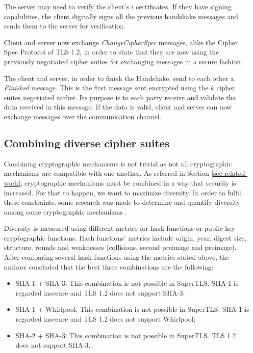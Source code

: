 \documentclass{sig-alternate-05-2015}
\begin{document}
The server may need to verify the client's $i$ certificates. If they have signing capabilities, the client digitally signs all the previous handshake messages and sends them to the server for verification.

Client and server now exchange \textit{ChangeCipherSpec} messages, alike the Cipher Spec Protocol of TLS 1.2, in order to state that they are now using the previously negotiated cipher suites for exchanging messages in a secure fashion.

The client and server, in order to finish the Handshake, send to each other a \textit{Finished} message. This is the first message sent encrypted using the $k$ cipher suites negotiated earlier. Its purpose is to each party receive and validate the data received in this message. If the data is valid, client and server can now exchange messages over the communication channel.

\subsection{Combining diverse cipher suites}

Combining cryptographic mechanisms is not trivial as not all cryptographic mechanisms are compatible with one another. As referred in Section \ref{sec-related-work}, cryptographic mechanisms must be combined in a way that security is increased. For that to happen, we want to maximize diversity.
In order to fulfil these constraints, some research was made to determine and quantify diversity among some cryptographic mechanisms \cite{CarvalhoThesis14}.

Diversity is measured using different metrics for hash functions or public-key cryptographic functions. Hash functions' metrics include origin, year, digest size, structure, rounds and weaknesses (collisions, second preimage and preimage).
After comparing several hash functions using the metrics stated above, the authors concluded that the best three combinations are the following:
\begin{itemize}
\item {SHA-1 + SHA-3: This combination is not possible in SuperTLS. SHA-1 is regarded insecure and TLS 1.2 does not support SHA-3;}
\item {SHA-1 + Whirlpool: This combination is not possible in SuperTLS. SHA-1 is regarded insecure and TLS 1.2 does not support Whirlpool;} 
\item {SHA-2 + SHA-3: This combination is not possible in SuperTLS. TLS 1.2 does not support SHA-3.}
\end{itemize}
\end{document}
